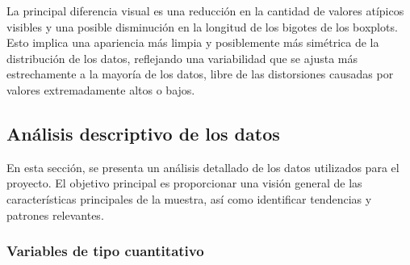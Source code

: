 \documentclass[
  11pt,
  bookmarksnumbered]{article}
\begin{document}
La principal diferencia visual es una reducción en la cantidad de valores atípicos visibles y una posible disminución en la longitud de los bigotes de los boxplots.
Esto implica una apariencia más limpia y posiblemente más simétrica de la distribución de los datos, reflejando una variabilidad que se ajusta más estrechamente a la mayoría de los datos, libre de las distorsiones causadas por valores extremadamente altos o bajos.

\newpage

\hypertarget{anuxe1lisis-descriptivo-de-los-datos}{%
\subsection{Análisis descriptivo de los datos}\label{anuxe1lisis-descriptivo-de-los-datos}}

En esta sección, se presenta un análisis detallado de los datos utilizados para el proyecto.
El objetivo principal es proporcionar una visión general de las características principales de la muestra, así como identificar tendencias y patrones relevantes.

\hypertarget{variables-de-tipo-cuantitativo}{%
\subsubsection{Variables de tipo cuantitativo}\label{variables-de-tipo-cuantitativo}}
\end{document}

